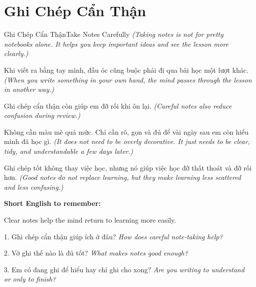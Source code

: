 \section{Ghi Chép Cẩn Thận}
\begin{truyen}{Ghi Chép Cẩn Thận}{Take Notes Carefully}
\textit{(Taking notes is not for pretty notebooks alone. It helps you keep important ideas and see the lesson more clearly.)}

Khi viết ra bằng tay mình, đầu óc cũng buộc phải đi qua bài học một lượt khác.
\textit{(When you write something in your own hand, the mind passes through the lesson in another way.)}

Ghi chép cẩn thận còn giúp em đỡ rối khi ôn lại.
\textit{(Careful notes also reduce confusion during review.)}

Không cần màu mè quá mức. Chỉ cần rõ, gọn và đủ để vài ngày sau em còn hiểu mình đã học gì.
\textit{(It does not need to be overly decorative. It just needs to be clear, tidy, and understandable a few days later.)}
\end{truyen}

\begin{baihoc}
Ghi chép tốt không thay việc học, nhưng nó giúp việc học đỡ thất thoát và đỡ rối hơn.
\textit{(Good notes do not replace learning, but they make learning less scattered and less confusing.)}
\end{baihoc}

\begin{ghinhoanh}
\textbf{Short English to remember:}

Clear notes help the mind return to learning more easily.

\end{ghinhoanh}

\begin{tuhocnhanh}
1. Ghi chép cẩn thận giúp ích ở đâu? \textit{How does careful note-taking help?}

2. Vở ghi thế nào là đủ tốt? \textit{What makes notes good enough?}

3. Em có đang ghi để hiểu hay chỉ ghi cho xong? \textit{Are you writing to understand or only to finish?}
\end{tuhocnhanh}
\ngancach

